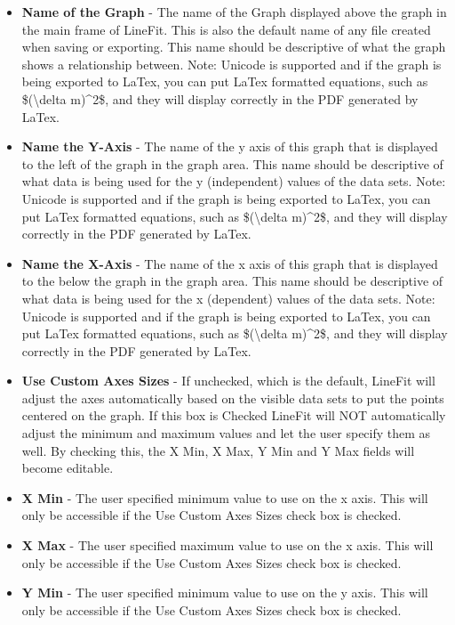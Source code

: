 \documentclass[titlepage,12pt]{article}
\begin{document}
\begin{itemize}
\item \textbf{Name of the Graph} - The name of the Graph displayed above the graph in the main frame of LineFit. This is also the default name of any file created when saving or exporting. This name should be descriptive of what the graph shows a relationship between. Note: Unicode is supported and if the graph is being exported to LaTex, you can put LaTex formatted equations, such as \$(\textbackslash{}delta m)\^{}2\$, and they will display correctly in the PDF generated by LaTex.
\item \textbf{Name the Y-Axis} - The name of the y axis of this graph that is displayed to the left of the graph in the graph area. This name should be descriptive of what data is being used for the y (independent) values of the data sets. Note: Unicode is supported and if the graph is being exported to LaTex, you can put LaTex formatted equations, such as \$(\textbackslash{}delta m)\^{}2\$, and they will display correctly in the PDF generated by LaTex.
\item \textbf{Name the X-Axis} - The name of the x axis of this graph that is displayed to the below the graph in the graph area. This name should be descriptive of what data is being used for the x (dependent) values of the data sets. Note: Unicode is supported and if the graph is being exported to LaTex, you can put LaTex formatted equations, such as \$(\textbackslash{}delta m)\^{}2\$, and they will display correctly in the PDF generated by LaTex.
\item \textbf{Use Custom Axes Sizes} - If unchecked, which is the default, LineFit will adjust the axes automatically based on the visible data sets to put the points centered on the graph. If this box is Checked LineFit will NOT automatically adjust the minimum and maximum values and let the user specify them as well. By checking this, the X Min, X Max, Y Min and Y Max fields will become editable.
\item \textbf{X Min} - The user specified minimum value to use on the x axis. This will only be accessible if the Use Custom Axes Sizes check box is checked.
\item \textbf{X Max} - The user specified maximum value to use on the x axis. This will only be accessible if the Use Custom Axes Sizes check box is checked.
\item \textbf{Y Min} - The user specified minimum value to use on the y axis. This will only be accessible if the Use Custom Axes Sizes check box is checked.

\end{itemize}
\end{document}
